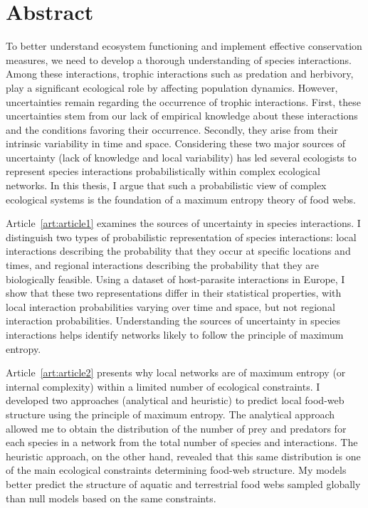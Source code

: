 \documentclass[12pt,twoside,phd]{dms}
\numberwithin{equation}{section}
\numberwithin{table}{chapter}
\numberwithin{figure}{chapter}
\begin{document}

\anglais
\chapter*{Abstract}

To better understand ecosystem functioning and implement effective conservation
measures, we need to develop a thorough understanding of species
interactions. Among these interactions, trophic interactions such as predation
and herbivory, play a significant ecological role by affecting
population dynamics. However, uncertainties remain regarding the occurrence of
trophic interactions. First, these uncertainties stem from our lack of empirical
knowledge about these interactions and the conditions favoring their occurrence.
Secondly, they arise from their intrinsic variability in time and space.
Considering these two major sources of uncertainty (lack of knowledge and local
variability) has led several ecologists to represent species interactions
probabilistically within complex ecological networks. In this thesis, I argue
that such a probabilistic view of complex ecological systems is the foundation
of a maximum entropy theory of food webs.

Article~\ref{art:article1} examines the sources of uncertainty in species
interactions. I distinguish two types of probabilistic representation of species
interactions: local interactions describing the probability that they occur at
specific locations and times, and regional interactions describing the
probability that they are biologically feasible. Using a dataset of
host-parasite interactions in Europe, I show that these two representations
differ in their statistical properties, with local interaction probabilities
varying over time and space, but not regional interaction probabilities.
Understanding the sources of uncertainty in species interactions helps identify
networks likely to follow the principle of maximum entropy.

Article~\ref{art:article2} presents why local networks are of maximum entropy
(or internal complexity) within a limited number of ecological constraints. I
developed two approaches (analytical and heuristic) to predict local food-web
structure using the principle of maximum entropy. The analytical approach
allowed me to obtain the distribution of the number of prey and predators for
each species in a network from the total number of species and interactions. The
heuristic approach, on the other hand, revealed that this same distribution is
one of the main ecological constraints determining food-web structure. My models
better predict the structure of aquatic and terrestrial food webs sampled
globally than null models based on the same constraints.
\end{document}
